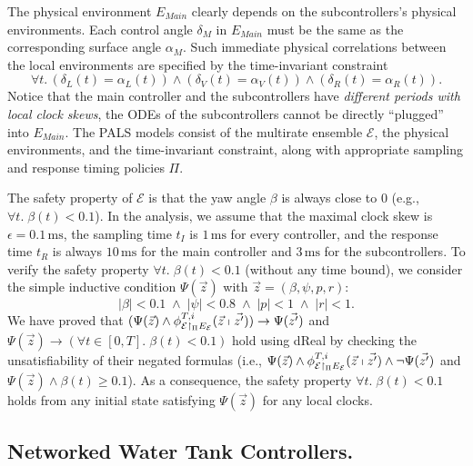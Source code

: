 The physical environment $E_\mathit{Main}$ clearly depends on the subcontrollers's physical environments.
Each control angle $\delta_M$ in  $E_\mathit{Main}$ must be the same as the corresponding surface angle $\alpha_M$.
%
Such  immediate physical correlations between the local %
environments are specified by the time-invariant constraint
%
\[\forall t.\, (\delta_L(t) = \alpha_L(t)) \wedge (\delta_V(t) = \alpha_V(t)) \wedge (\delta_R(t) = \alpha_R(t)).
\]
Notice that the main controller and the subcontrollers have \emph{different periods with local clock skews},
the ODEs of the subcontrollers cannot be directly ``plugged'' into $E_\mathit{Main}$.
The PALS models consist of the multirate ensemble $\mathcal{E}$, the physical environments, and the time-invariant constraint,
along with appropriate  sampling and response timing policies $\Pi$.

The safety property of $\mathcal{E}$ 
is that the yaw angle $\beta$ is always close to $0$ (e.g., $\forall t.\; \beta(t) < 0.1$).
In the analysis,
we assume that the maximal clock skew is $\epsilon = 0.1\,\mathrm{ms}$,
the sampling time $t_I$ is $1\,\mathrm{ms}$ for every controller,
and the response time $t_R$ is always $10\,\mathrm{ms}$ for the main controller
and $3\,\mathrm{ms}$ for the subcontrollers.
To verify the safety property $\forall t.\; \beta(t) < 0.1$ (without any time bound), 
we consider the simple inductive condition $\Psi(\vec{z})$ with $\vec{z} = (\beta,\psi,p,r)$:
\[
|\beta| < 0.1
\;\wedge\;
|\psi| < 0.8
\;\wedge\;
|p| < 1
\;\wedge\;
|r| < 1.
\]
We have proved that $(\Psi(\vec{z}) \wedge \phi_{\mathcal{E} \restriction_{\Pi} E_\mathcal{E}}^{T,i}(\vec{z}\shortmid\vec{z'})) \rightarrow \Psi(\vec{z'})$
and  $\Psi(\vec{z}) \rightarrow (\forall t \in [0,T].\; \beta(t) < 0.1)$ hold
using \textsf{dReal} by checking the unsatisfiability of their negated formulas
(i.e.,
 $\Psi(\vec{z}) \wedge \phi_{\mathcal{E} \restriction_{\Pi} E_\mathcal{E}}^{T,i}(\vec{z}\shortmid\vec{z'}) \wedge \neg \Psi(\vec{z'})$ and $\Psi(\vec{z}) \wedge \beta(t) \geq 0.1$).
As a consequence, the safety property $\forall t.\; \beta(t) < 0.1$
holds from any initial state satisfying $\Psi(\vec{z})$ for any local clocks.



\subsection{Networked Water Tank Controllers.}


